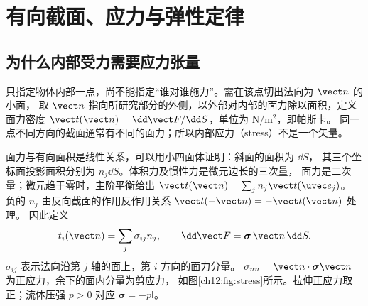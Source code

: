 \section{有向截面、应力与弹性定律}

\subsection{为什么内部受力需要应力张量}

只指定物体内部一点，尚不能指定“谁对谁施力”。需在该点切出法向为 $\vect n$ 的小面，
取 $\vect n$ 指向所研究部分的外侧，以外部对内部的面力除以面积，定义面力密度
$\vect t(\vect n)=\dd\vect F/\dd S$，单位为 $\mathrm{N/m^2}$，即帕斯卡。
同一点不同方向的截面通常有不同的面力；所以内部应力（stress）不是一个矢量。

面力与有向面积是线性关系，可以用小四面体证明：斜面的面积为 $\dd S$，
其三个坐标面投影面积分别为 $n_j\dd S$。体积力及惯性力是微元边长的三次量，
面力是二次量；微元趋于零时，主阶平衡给出
$\vect t(\vect n)=\sum_j n_j\vect t(\uvec e_j)$。
负的 $n_j$ 由反向截面的作用反作用关系 $\vect t(-\vect n)=-\vect t(\vect n)$ 处理。
因此定义
\begin{equation}
 t_i(\vect n)=\sum_j\sigma_{ij}n_j,\qquad
 \dd\vect F=\boldsymbol\sigma\,\vect n\,\dd S.
 \label{ch12:eq:traction}
\end{equation}
$\sigma_{ij}$ 表示法向沿第 $j$ 轴的面上，第 $i$ 方向的面力分量。
$\sigma_{nn}=\vect n\cdot\boldsymbol\sigma\vect n$ 为正应力，余下的面内分量为剪应力，
如图\ref{ch12:fig:stress}所示。拉伸正应力取正；流体压强 $p>0$ 对应 $\boldsymbol\sigma=-p\mathsf I$。

\begin{center}
\label{ch12:fig:stress}
\end{center}

